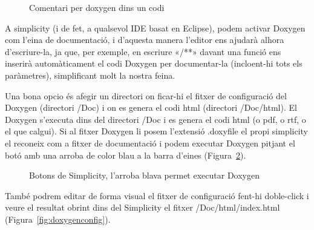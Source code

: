 \begin{figure}
 \centering
 \caption{Comentari per doxygen dins un codi}
 \label{fig:doxygencode}
\end{figure}

A simplicity (i de fet, a qualsevol IDE basat en Eclipse), podem activar Doxygen com l'eina de documentació, i d'aquesta manera l'editor ens ajudarà alhora d'escriure-la, ja que, per exemple, en escriure «/**» davant una funció ens inserirà automàticament el codi Doxygen per documentar-la (incloent-hi tots els paràmetres), simplificant molt la nostra feina.

Una bona opcio és afegir un directori on ficar-hi el fitxer de configuració del Doxygen (directori /Doc) i on es genera el codi html (directori /Doc/html). El Doxygen s'executa dins del directori /Doc i es genera el codi html (o pdf, o rtf, o el que calgui). Si al fitxer Doxygen li posem l'extensió .doxyfile el propi simplicity el reconeix com a fitxer de documentació i podem executar Doxygen pitjant el botó amb una arroba de color blau a la barra d'eines (Figura~\ref{fig:doxygenbutton}).

\begin{figure}[h!]
 \centering
 \caption{Botons de Simplicity, l'arroba blava permet executar Doxygen}
 \label{fig:doxygenbutton}
\end{figure}


També podrem editar de forma visual el fitxer de configuració fent-hi doble-click i veure el resultat obrint dins del Simplicity el fitxer /Doc/html/index.html (Figura~\ref{fig:doxygenconfig}).

